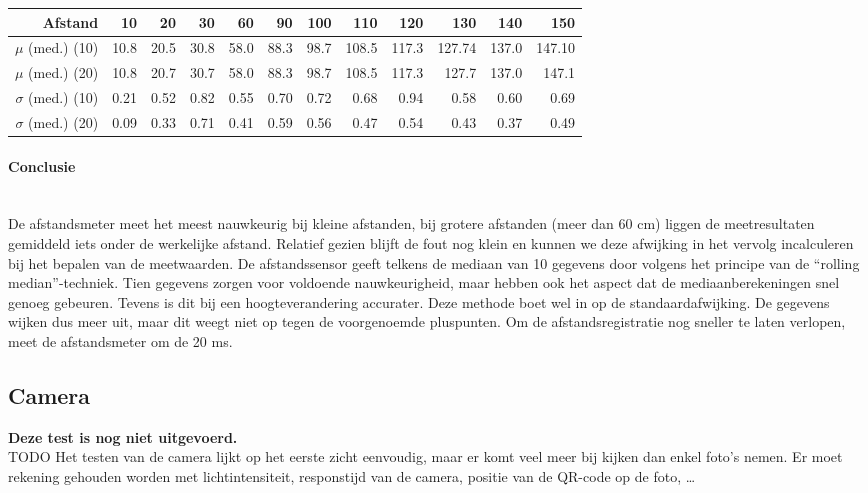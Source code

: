 \documentclass[eind]{penoverslag}
\begin{document}
\begin{tabular}{r||r|r|r|r|r|r|r|r|r|r|r}
\textbf{Afstand} & 10 & 20 & 30 & 60 & 90 & 100 & 110 & 120 & 130 & 140 & 150 \\
\hline \hline 
$\mu$ (med.) (10) & 10.8 & 20.5 & 30.8 & 58.0 & 88.3 & 98.7 & 108.5 & 117.3 & 127.74 & 137.0 & 147.10 \\
$\mu$ (med.) (20) & 10.8 & 20.7 & 30.7 & 58.0 & 88.3 & 98.7 & 108.5 & 117.3 & 127.7 & 137.0 & 147.1 \\
$\sigma$ (med.) (10) & 0.21 & 0.52 & 0.82 & 0.55 & 0.70 & 0.72 & 0.68 & 0.94 & 0.58 & 0.60 & 0.69 \\
$\sigma$ (med.) (20)& 0.09 & 0.33 & 0.71 & 0.41 & 0.59 & 0.56 & 0.47 & 0.54 & 0.43 & 0.37 & 0.49 \\
\end{tabular}

\paragraph{Conclusie} ~\\ 
De afstandsmeter meet het meest nauwkeurig bij kleine afstanden, bij grotere afstanden (meer dan 60 cm) liggen de meetresultaten gemiddeld iets onder de werkelijke afstand. Relatief gezien blijft de fout nog klein en kunnen we deze afwijking in het vervolg incalculeren bij het bepalen van de meetwaarden. De afstandssensor geeft telkens de mediaan van 10 gegevens door volgens het principe van de “rolling median”-techniek. Tien gegevens zorgen voor voldoende nauwkeurigheid, maar hebben ook het aspect dat de mediaanberekeningen snel genoeg gebeuren. Tevens is dit bij een hoogteverandering accurater. Deze methode boet wel in op de standaardafwijking. De gegevens wijken dus meer uit, maar dit weegt niet op tegen de voorgenoemde pluspunten. Om de afstandsregistratie nog sneller te laten verlopen, meet de afstandsmeter om de 20 ms.

\subsection{Camera}

\textbf{Deze test is nog niet uitgevoerd.} \\
TODO
Het testen van de camera lijkt op het eerste zicht eenvoudig, maar er komt veel meer bij kijken dan enkel foto's nemen. Er moet rekening gehouden worden met lichtintensiteit, responstijd van de camera, positie van de QR-code op de foto, \ldots \\
\end{document}
